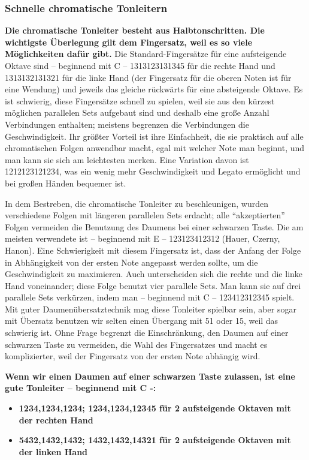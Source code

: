\subsubsection{Schnelle chromatische Tonleitern}
\label{c1iii5h}

\textbf{Die chromatische Tonleiter besteht aus Halbtonschritten.
Die wichtigste Überlegung gilt dem Fingersatz, weil es so viele Möglichkeiten dafür gibt.}
Die Standard-Fingersätze für eine aufsteigende Oktave sind -- beginnend mit C -- 1313123131345 für die rechte Hand und 1313132131321 für die linke Hand (der Fingersatz für die oberen Noten ist für eine Wendung) und jeweils das gleiche rückwärts für eine absteigende Oktave.
Es ist schwierig, diese Fingersätze schnell zu spielen, weil sie aus den kürzest möglichen parallelen Sets aufgebaut sind und deshalb eine große Anzahl Verbindungen enthalten; meistens begrenzen die Verbindungen die Geschwindigkeit. 
Ihr größter Vorteil ist ihre Einfachheit, die sie praktisch auf alle chromatischen Folgen anwendbar macht, egal mit welcher Note man beginnt, und man kann sie sich am leichtesten merken.
Eine Variation davon ist 1212123121234, was ein wenig mehr Geschwindigkeit und Legato ermöglicht und bei großen Händen bequemer ist.

In dem Bestreben, die chromatische Tonleiter zu beschleunigen, wurden verschiedene Folgen mit längeren parallelen Sets erdacht; alle \enquote{akzeptierten} Folgen vermeiden die Benutzung des Daumens bei einer schwarzen Taste.
Die am meisten verwendete ist -- beginnend mit E -- 123123412312 (Hauer, Czerny, Hanon).
Eine Schwierigkeit mit diesem Fingersatz ist, dass der Anfang der Folge in Abhängigkeit von der ersten Note angepasst werden sollte, um die Geschwindigkeit zu maximieren.
Auch unterscheiden sich die rechte und die linke Hand voneinander; diese Folge benutzt vier parallele Sets.
Man kann sie auf drei parallele Sets verkürzen, indem man -- beginnend mit C -- 123412312345 spielt.
Mit guter Daumenübersatztechnik mag diese Tonleiter spielbar sein, aber sogar mit Übersatz benutzen wir selten einen Übergang mit 51 oder 15, weil das schwierig ist.
Ohne Frage begrenzt die Einschränkung, den Daumen auf einer schwarzen Taste zu vermeiden, die Wahl des Fingersatzes und macht es komplizierter, weil der Fingersatz von der ersten Note abhängig wird.

\textbf{Wenn wir einen Daumen auf einer schwarzen Taste zulassen, ist eine gute Tonleiter -- beginnend mit C -:}

\begin{itemize} 
 \item \textbf{1234,1234,1234; 1234,1234,12345 für 2 aufsteigende Oktaven mit der rechten Hand}
 \item \textbf{5432,1432,1432; 1432,1432,14321 für 2 aufsteigende Oktaven mit der linken Hand}
\end{itemize}

